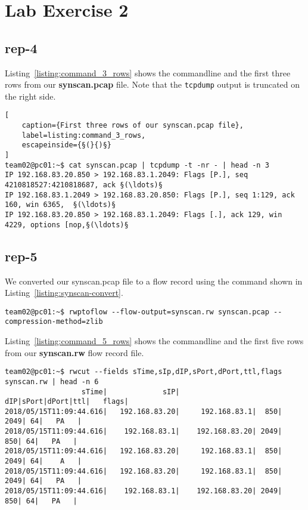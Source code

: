 \documentclass{article}
\begin{document}
\section{Lab Exercise 2}

\subsection{rep-4}

Listing~\ref{listing:command_3_rows} shows the commandline and the first three rows from
our \textbf{synscan.pcap} file. Note that the \texttt{tcpdump} output is truncated on the
right side.

\begin{lstlisting}[
    caption={First three rows of our synscan.pcap file},
    label=listing:command_3_rows,
    escapeinside={§(}{)§}
]
team02@pc01:~$ cat synscan.pcap | tcpdump -t -nr - | head -n 3
IP 192.168.83.20.850 > 192.168.83.1.2049: Flags [P.], seq 4210818527:4210818687, ack §(\ldots)§
IP 192.168.83.1.2049 > 192.168.83.20.850: Flags [P.], seq 1:129, ack 160, win 6365,  §(\ldots)§
IP 192.168.83.20.850 > 192.168.83.1.2049: Flags [.], ack 129, win 4229, options [nop,§(\ldots)§
\end{lstlisting}

\subsection{rep-5}

We converted our synscan.pcap file to a flow record using the command shown in
Listing~\ref{listing:synscan-convert}.

\begin{lstlisting}[label=listing:synscan-convert,caption={Command used to convert synscan.pcap}]
team02@pc01:~$ rwptoflow --flow-output=synscan.rw synscan.pcap --compression-method=zlib
\end{lstlisting}

Listing~\ref{listing:command_5_rows} shows the commandline and the first five rows from our
\textbf{synscan.rw} flow record file.

\begin{lstlisting}[label=listing:command_5_rows,caption={First five rows of our synscan.rw file}]
team02@pc01:~$ rwcut --fields sTime,sIp,dIP,sPort,dPort,ttl,flags synscan.rw | head -n 6
                  sTime|             sIP|              dIP|sPort|dPort|ttl|   flags|
2018/05/15T11:09:44.616|   192.168.83.20|     192.168.83.1|  850| 2049| 64|   PA   |
2018/05/15T11:09:44.616|    192.168.83.1|    192.168.83.20| 2049|  850| 64|   PA   |
2018/05/15T11:09:44.616|   192.168.83.20|     192.168.83.1|  850| 2049| 64|    A   |
2018/05/15T11:09:44.616|   192.168.83.20|     192.168.83.1|  850| 2049| 64|   PA   |
2018/05/15T11:09:44.616|    192.168.83.1|    192.168.83.20| 2049|  850| 64|   PA   |
\end{lstlisting}
\end{document}
